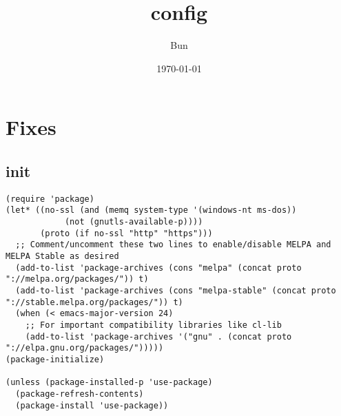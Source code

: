 \documentclass[11pt]{article}
\author{Bun}
\date{\today}
\title{config}
\begin{document}
\maketitle
\tableofcontents

\section{Fixes}
\label{sec-1}
\subsection{init}
\label{sec-1-1}
\begin{verbatim}
(require 'package)
(let* ((no-ssl (and (memq system-type '(windows-nt ms-dos))
		    (not (gnutls-available-p))))
       (proto (if no-ssl "http" "https")))
  ;; Comment/uncomment these two lines to enable/disable MELPA and MELPA Stable as desired
  (add-to-list 'package-archives (cons "melpa" (concat proto "://melpa.org/packages/")) t)
  (add-to-list 'package-archives (cons "melpa-stable" (concat proto "://stable.melpa.org/packages/")) t)
  (when (< emacs-major-version 24)
    ;; For important compatibility libraries like cl-lib
    (add-to-list 'package-archives '("gnu" . (concat proto "://elpa.gnu.org/packages/")))))
(package-initialize)

(unless (package-installed-p 'use-package)
  (package-refresh-contents)
  (package-install 'use-package))


\end{verbatim}
\end{document}
